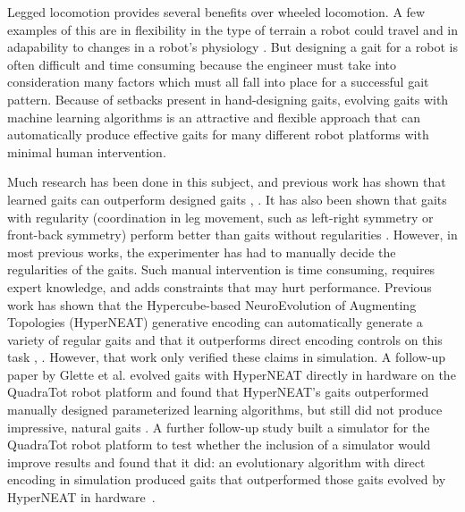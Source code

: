 Legged locomotion provides several benefits over wheeled locomotion. 
A few examples of this are in flexibility in the type of terrain a robot could travel and in adapability to changes in a robot's physiology \cite{bongard:lipson}.
But designing a gait for a robot is often difficult and time consuming because the engineer must take into consideration many factors which must all fall into place for a successful gait pattern. 
Because of setbacks present in hand-designing gaits, evolving gaits with machine learning algorithms is an attractive and flexible approach that can automatically produce effective gaits for many different robot platforms with minimal human intervention. 

Much research has been done in this subject, and previous work has shown that learned gaits can outperform designed gaits \cite{valsalam:mii}, \cite{kohl:stone}. %
It has also been shown that gaits with regularity (coordination in leg movement, such as left-right symmetry or front-back symmetry) perform better than gaits without regularities 
\cite{valsalam:mii,clune2,clune1,clune3}. %
However, in most previous works, the experimenter has had to manually decide the regularities of the gaits. %
Such manual intervention is time consuming, requires expert knowledge, and adds constraints that may hurt performance. 
Previous work has shown that the Hypercube-based NeuroEvolution of Augmenting Topologies (HyperNEAT) generative encoding \cite{stanley1} can automatically generate a variety of regular gaits and that it outperforms direct encoding controls on this task \cite{clune1}, \cite{clune2}. 
However, that work only verified these claims in simulation. 
A follow-up paper by Glette et al. evolved gaits with HyperNEAT directly in hardware on the QuadraTot robot platform and found that HyperNEAT's gaits outperformed manually designed parameterized learning algorithms, but still did not produce impressive, natural gaits \cite{yos:clune}. %
A further follow-up study built a simulator for the QuadraTot robot platform to test whether the inclusion of a simulator would improve results and found that it did:  an evolutionary algorithm with direct encoding in simulation produced gaits that outperformed those gaits evolved by HyperNEAT in hardware~\cite{glette}. %

